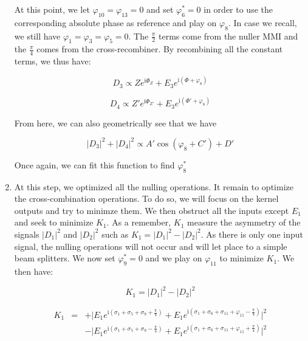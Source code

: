\documentclass{aa}
\newcommand{\mi}{\mathrm{i}}
\begin{document}
\begin{enumerate}
                    At this point, we let $\varphi_{10} = \varphi_{13} = 0$ and set $\varphi_6^* = 0$ in order to use the corresponding absolute phase as reference and play on $\varphi_8$. In case we recall, we still have $\varphi_1 = \varphi_3 = \varphi_5 = 0$. The $\frac \pi 2$ terms come from the nuller MMI and the $\frac \pi 4$ comes from the cross-recombiner. By recombining all the constant terms, we thus have:
    
                    \begin{equation}
                    D_3 \propto Z e^{\mi\Phi_Z} + E_3 e^{\mi\left(\Phi + \varphi_8\right)}
                    \end{equation}
    
                    \begin{equation}
                    D_4 \propto Z' e^{\mi\Phi_{Z'}} + E_3 e^{\mi\left(\Phi' + \varphi_8\right)}
                    \end{equation}
    
                    From here, we can also geometrically see that we have
    
                    \begin{equation}
                    |D_3|^2 + |D_4|^2 \propto A'\cos(\varphi_8 + C') + D'
                    \end{equation}
    
                    Once again, we can fit this function to find $\varphi_8^*$
                
                \item At this step, we optimized all the nulling operations. It remain to optimize the cross-combination operations. To do so, we will focus on the kernel outputs and try to minimze them. We then obstruct all the inputs except $E_1$ and seek to minimize $K_1$. As a remember, $K_1$ measure the asymmetry of the signals $|D_1|^2$ and $|D_2|^2$ such as $K_1 = |D_1|^2 - |D_2|^2$. As there is only one input signal, the nulling operations will not occur and will let place to a simple beam splitters. We now set $\varphi^*_{9} = 0$ and we play on $\varphi_{11}$ to minimize $K_1$. We then have:
                
                    \begin{equation}
                        K_1 = |D_1|^2 - |D_2|^2
                    \end{equation}
                    
                    \begin{equation}
                        \begin{split}
                            K_1 & = &+ \bigg|E_1e^{\mi(\sigma_1 + \sigma_5 + \sigma_9 + \frac{\pi}{4})} + E_1e^{\mi(\sigma_1 + \sigma_6 + \sigma_{11} + \varphi_{11} - \frac{\pi}{4})}\bigg|^2 \\
                                &   &- \bigg|E_1e^{\mi(\sigma_1 + \sigma_5 + \sigma_9 - \frac{\pi}{4})} + E_1e^{\mi(\sigma_1 + \sigma_6 + \sigma_{11} + \varphi_{11} + \frac{\pi}{4})}\bigg|^2
                        \end{split}
                    \end{equation}


\end{enumerate}
\end{document}
